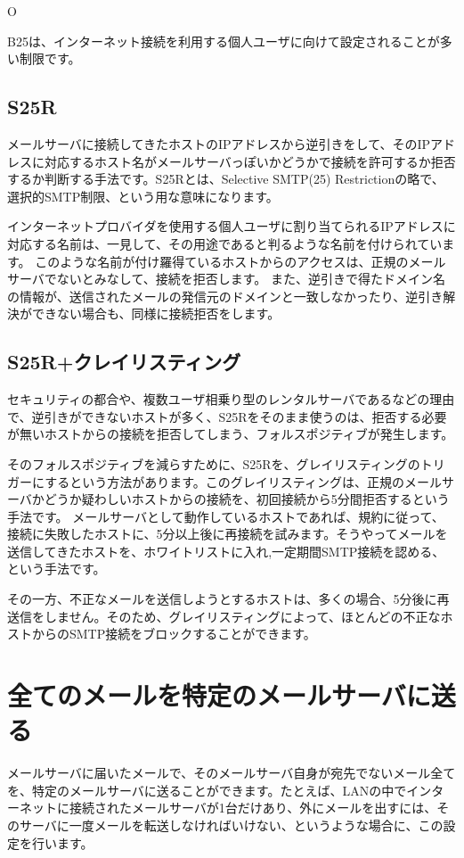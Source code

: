 O{B25は、インターネット接続を利用する個人ユーザに向けて設定されることが多い制限です。

\subsection{S25R}

メールサーバに接続してきたホストのIPアドレスから逆引きをして、そのIPアドレスに対応するホスト名がメールサーバっぽいかどうかで接続を許可するか拒否するか判断する手法です。S25Rとは、Selective SMTP(25) Restrictionの略で、選択的SMTP制限、という用な意味になります。

インターネットプロバイダを使用する個人ユーザに割り当てられるIPアドレスに対応する名前は、一見して、その用途であると判るような名前を付けられています。
このような名前が付け羅得ているホストからのアクセスは、正規のメールサーバでないとみなして、接続を拒否します。
また、逆引きで得たドメイン名の情報が、送信されたメールの発信元のドメインと一致しなかったり、逆引き解決ができない場合も、同様に接続拒否をします。

\subsection{S25R+クレイリスティング}
セキュリティの都合や、複数ユーザ相乗り型のレンタルサーバであるなどの理由で、逆引きができないホストが多く、S25Rをそのまま使うのは、拒否する必要が無いホストからの接続を拒否してしまう、フォルスポジティブが発生します。

そのフォルスポジティブを減らすために、S25Rを、グレイリスティングのトリガーにするという方法があります。このグレイリスティングは、正規のメールサーバかどうか疑わしいホストからの接続を、初回接続から5分間拒否するという手法です。
メールサーバとして動作しているホストであれば、規約に従って、接続に失敗したホストに、5分以上後に再接続を試みます。そうやってメールを送信してきたホストを、ホワイトリストに入れ,一定期間SMTP接続を認める、という手法です。

その一方、不正なメールを送信しようとするホストは、多くの場合、5分後に再送信をしません。そのため、グレイリスティングによって、ほとんどの不正なホストからのSMTP接続をブロックすることができます。




\section{全てのメールを特定のメールサーバに送る}
メールサーバに届いたメールで、そのメールサーバ自身が宛先でないメール全てを、特定のメールサーバに送ることができます。たとえば、LANの中でインターネットに接続されたメールサーバが1台だけあり、外にメールを出すには、そのサーバに一度メールを転送しなければいけない、というような場合に、この設定を行います。

}
